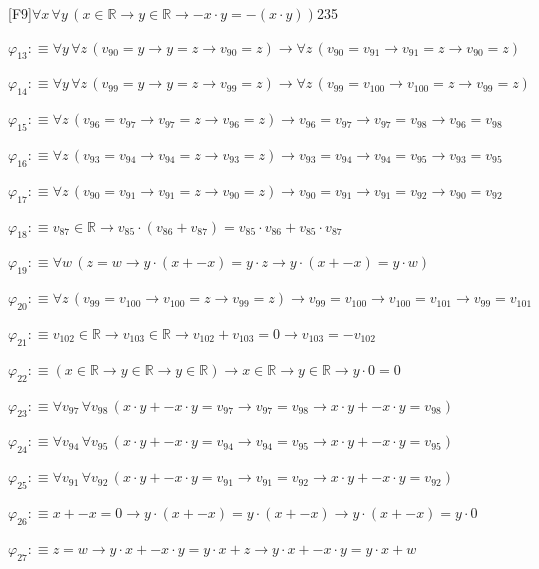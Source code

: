 \begin{fullproof}{[F9]}{$\forall x\,\forall y\,(x \in \mathbb{R} \to y \in \mathbb{R} \to -x \cdot y = -(x \cdot y))$}{235}
\begin{abbrevlist}
\item $\varphi_{13} :\equiv \forall y\,\forall z\,(v_{90} = y \to y = z \to v_{90} = z) \to \forall z\,(v_{90} = v_{91} \to v_{91} = z \to v_{90} = z)$
\item $\varphi_{14} :\equiv \forall y\,\forall z\,(v_{99} = y \to y = z \to v_{99} = z) \to \forall z\,(v_{99} = v_{100} \to v_{100} = z \to v_{99} = z)$
\item $\varphi_{15} :\equiv \forall z\,(v_{96} = v_{97} \to v_{97} = z \to v_{96} = z) \to v_{96} = v_{97} \to v_{97} = v_{98} \to v_{96} = v_{98}$
\item $\varphi_{16} :\equiv \forall z\,(v_{93} = v_{94} \to v_{94} = z \to v_{93} = z) \to v_{93} = v_{94} \to v_{94} = v_{95} \to v_{93} = v_{95}$
\item $\varphi_{17} :\equiv \forall z\,(v_{90} = v_{91} \to v_{91} = z \to v_{90} = z) \to v_{90} = v_{91} \to v_{91} = v_{92} \to v_{90} = v_{92}$
\item $\varphi_{18} :\equiv v_{87} \in \mathbb{R} \to v_{85} \cdot (v_{86} + v_{87}) = v_{85} \cdot v_{86} + v_{85} \cdot v_{87}$
\item $\varphi_{19} :\equiv \forall w\,(z = w \to y \cdot (x + -x) = y \cdot z \to y \cdot (x + -x) = y \cdot w)$
\item $\varphi_{20} :\equiv \forall z\,(v_{99} = v_{100} \to v_{100} = z \to v_{99} = z) \to v_{99} = v_{100} \to v_{100} = v_{101} \to v_{99} = v_{101}$
\item $\varphi_{21} :\equiv v_{102} \in \mathbb{R} \to v_{103} \in \mathbb{R} \to v_{102} + v_{103} = 0 \to v_{103} = -v_{102}$
\item $\varphi_{22} :\equiv (x \in \mathbb{R} \to y \in \mathbb{R} \to y \in \mathbb{R}) \to x \in \mathbb{R} \to y \in \mathbb{R} \to y \cdot 0 = 0$
\item $\varphi_{23} :\equiv \forall v_{97}\,\forall v_{98}\,(x \cdot y + -x \cdot y = v_{97} \to v_{97} = v_{98} \to x \cdot y + -x \cdot y = v_{98})$
\item $\varphi_{24} :\equiv \forall v_{94}\,\forall v_{95}\,(x \cdot y + -x \cdot y = v_{94} \to v_{94} = v_{95} \to x \cdot y + -x \cdot y = v_{95})$
\item $\varphi_{25} :\equiv \forall v_{91}\,\forall v_{92}\,(x \cdot y + -x \cdot y = v_{91} \to v_{91} = v_{92} \to x \cdot y + -x \cdot y = v_{92})$
\item $\varphi_{26} :\equiv x + -x = 0 \to y \cdot (x + -x) = y \cdot (x + -x) \to y \cdot (x + -x) = y \cdot 0$
\item $\varphi_{27} :\equiv z = w \to y \cdot x + -x \cdot y = y \cdot x + z \to y \cdot x + -x \cdot y = y \cdot x + w$

\end{abbrevlist}
\end{fullproof}
